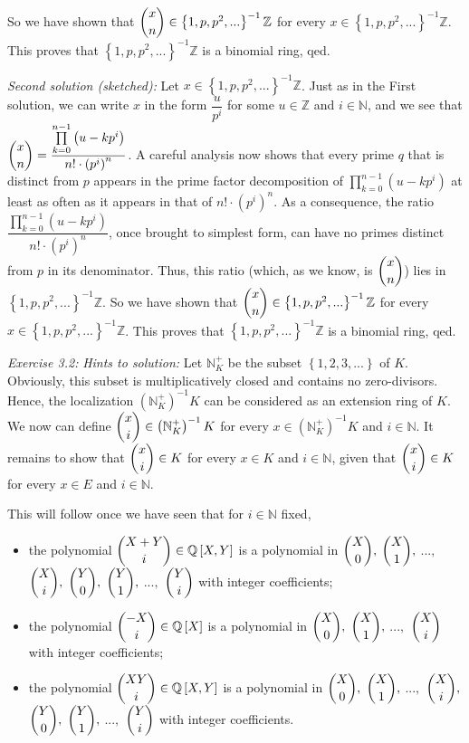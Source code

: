 \documentclass[numbers=enddot,12pt,final,onecolumn,notitlepage]{scrartcl}%
\begin{document}
So we have shown that $\dbinom{x}{n}\in\left\{  1,p,p^{2},...\right\}
^{-1}\mathbb{Z}$ for every $x\in\left\{  1,p,p^{2},...\right\}  ^{-1}%
\mathbb{Z}$. This proves that $\left\{  1,p,p^{2},...\right\}  ^{-1}%
\mathbb{Z}$ is a binomial ring, qed.

\textit{Second solution (sketched):} Let $x\in\left\{  1,p,p^{2},...\right\}
^{-1}\mathbb{Z}$. Just as in the First solution, we can write $x$ in the form
$\dfrac{u}{p^{i}}$ for some $u\in\mathbb{Z}$ and $i\in\mathbb{N}$, and we see
that $\dbinom{x}{n}=\dfrac{\prod\limits_{k=0}^{n-1}\left(  u-kp^{i}\right)
}{n!\cdot\left(  p^{i}\right)  ^{n}}$. A careful analysis now shows that every
prime $q$ that is distinct from $p$ appears in the prime factor decomposition
of $\prod\limits_{k=0}^{n-1}\left(  u-kp^{i}\right)  $ at least as often as it
appears in that of $n!\cdot\left(  p^{i}\right)  ^{n}$. As a consequence, the
ratio $\dfrac{\prod\limits_{k=0}^{n-1}\left(  u-kp^{i}\right)  }%
{n!\cdot\left(  p^{i}\right)  ^{n}}$, once brought to simplest form, can have
no primes distinct from $p$ in its denominator. Thus, this ratio (which, as we
know, is $\dbinom{x}{n}$) lies in $\left\{  1,p,p^{2},...\right\}
^{-1}\mathbb{Z}$. So we have shown that $\dbinom{x}{n}\in\left\{
1,p,p^{2},...\right\}  ^{-1}\mathbb{Z}$ for every $x\in\left\{  1,p,p^{2}%
,...\right\}  ^{-1}\mathbb{Z}$. This proves that $\left\{  1,p,p^{2}%
,...\right\}  ^{-1}\mathbb{Z}$ is a binomial ring, qed.

\textit{Exercise 3.2:} \textit{Hints to solution:} Let $\mathbb{N}_{K}^{+}$ be
the subset $\left\{  1,2,3,...\right\}  $ of $K$. Obviously, this subset is
multiplicatively closed and contains no zero-divisors. Hence, the localization
$\left(  \mathbb{N}_{K}^{+}\right)  ^{-1}K$ can be considered as an extension
ring of $K$. We now can define $\dbinom{x}{i}\in\left(  \mathbb{N}_{K}%
^{+}\right)  ^{-1}K$ for every $x\in\left(  \mathbb{N}_{K}^{+}\right)  ^{-1}K$
and $i\in\mathbb{N}$. It remains to show that $\dbinom{x}{i}\in K$ for every
$x\in K$ and $i\in\mathbb{N}$, given that $\dbinom{x}{i}\in K$ for every $x\in
E$ and $i\in\mathbb{N}$.

This will follow once we have seen that for $i\in\mathbb{N}$ fixed,

\begin{itemize}
\item the polynomial $\dbinom{X+Y}{i}\in\mathbb{Q}\left[  X,Y\right]  $ is a
polynomial in $\dbinom{X}{0},$ $\dbinom{X}{1},$ $...,$ $\dbinom{X}{i},$
$\dbinom{Y}{0},$ $\dbinom{Y}{1},$ $...,$ $\dbinom{Y}{i}$ with integer coefficients;

\item the polynomial $\dbinom{-X}{i}\in\mathbb{Q}\left[  X\right]  $ is a
polynomial in $\dbinom{X}{0},$ $\dbinom{X}{1},$ $...,$ $\dbinom{X}{i}$ with
integer coefficients;

\item the polynomial $\dbinom{XY}{i}\in\mathbb{Q}\left[  X,Y\right]  $ is a
polynomial in $\dbinom{X}{0},$ $\dbinom{X}{1},$ $...,$ $\dbinom{X}{i},$
$\dbinom{Y}{0},$ $\dbinom{Y}{1},$ $...,$ $\dbinom{Y}{i}$ with integer coefficients.
\end{itemize}
\end{document}
